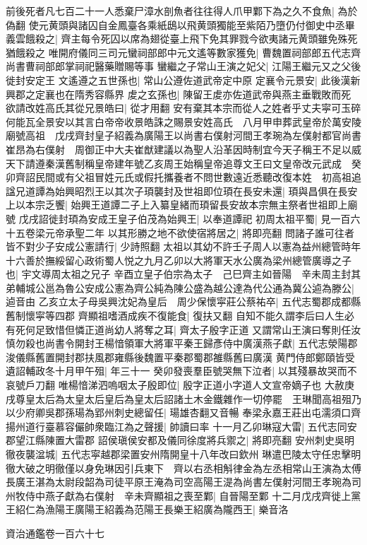 前後死者凡七百二十一人悉棄尸漳水剖魚者往往得人爪甲鄴下為之久不食魚|{
	為於偽翻}
使元黄頭與諸囚自金鳳臺各乘紙鴟以飛黄頭獨能至紫陌乃墮仍付御史中丞畢義雲餓殺之|{
	齊主每令死囚以席為翅從臺上飛下免其罪戮今欲夷諸元黄頭雖免殊死猶餓殺之}
唯開府儀同三司元蠻祠部郎中元文遙等數家獲免|{
	曹魏置祠部郎五代志齊尚書曹祠部郎掌祠祀醫藥贈賜等事}
蠻繼之子常山王演之妃父|{
	江陽王繼元又之父後徙封安定王}
文遙遵之五世孫也|{
	常山公遵佐道武帝定中原}
定襄令元景安|{
	此後漢新興郡之定襄也在隋秀容縣界}
䖍之玄孫也|{
	陳留王䖍亦佐道武帝與燕主垂戰敗而死}
欲請改姓高氏其從兄景皓曰|{
	從才用翻}
安有棄其本宗而從人之姓者乎丈夫寜可玉碎何能瓦全景安以其言白帝帝收景皓誅之賜景安姓高氏　八月甲申葬武皇帝於萬安陵廟號高祖　戊戌齊封皇子紹義為廣陽王以尚書右僕射河間王孝琬為左僕射都官尚書崔昂為右僕射　周御正中大夫崔猷建議以為聖人沿革因時制宜今天子稱王不足以威天下請遵秦漢舊制稱皇帝建年號乙亥周王始稱皇帝追尊文王曰文皇帝改元武成　癸卯齊詔民間或有父祖冒姓元氏或假托攜養者不問世數遠近悉聽改復本姓　初高祖追諡兄道譚為始興昭烈王以其次子頊襲封及世祖即位頊在長安未還|{
	頊與昌俱在長安}
上以本宗乏饗|{
	始興王道譚二子上入纂皇緒而頊留長安故本宗無主祭者世祖即上廟號}
戊戌詔徙封頊為安成王皇子伯茂為始興王|{
	以奉道譚祀}
初周太祖平蜀|{
	見一百六十五卷梁元帝承聖二年}
以其形勝之地不欲使宿將居之|{
	將即亮翻}
問諸子誰可往者皆不對少子安成公憲請行|{
	少詩照翻}
太祖以其幼不許壬子周人以憲為益州總管時年十六善於撫綏留心政術蜀人悦之九月乙卯以大將軍天水公廣為梁州總管廣導之子也|{
	宇文導周太祖之兄子}
辛酉立皇子伯宗為太子　己巳齊主如晉陽　辛未周主封其弟輔城公邕為魯公安成公憲為齊公純為陳公盛為越公達為代公通為冀公逌為滕公|{
	逌音由}
乙亥立太子母吳興沈妃為皇后　周少保懷寜莊公蔡祐卒|{
	五代志蜀郡成都縣舊制懷寜等四郡}
齊顯祖嗜酒成疾不復能食|{
	復扶又翻}
自知不能久謂李后曰人生必有死何足致惜但憐正道尚幼人將奪之耳|{
	齊太子殷字正道}
又謂常山王演曰奪則任汝慎勿殺也尚書令開封王楊愔領軍大將軍平秦王歸彥侍中廣漢燕子獻|{
	五代志滎陽郡浚儀縣舊置開封郡扶風郡雍縣後魏置平秦郡蜀郡雒縣舊曰廣漢}
黄門侍郎鄭頤皆受遺詔輔政冬十月甲午殂|{
	年三十一}
癸卯發喪羣臣號哭無下泣者|{
	以其殘暴故哭而不哀號戶刀翻}
唯楊愔涕泗嗚咽太子殷即位|{
	殷字正道小字道人文宣帝嫡子也}
大赦庚戌尊皇太后為太皇太后皇后為皇太后詔諸土木金鐵雜作一切停罷　王琳聞高祖殂乃以少府卿吳郡孫瑒為郢州刺史總留任|{
	瑒雄杏翻又音暢}
奉梁永嘉王莊出屯濡須口齊揚州道行臺慕容儼帥衆臨江為之聲援|{
	帥讀曰率}
十一月乙卯琳寇大雷|{
	五代志同安郡望江縣陳置大雷郡}
詔侯瑱侯安都及儀同徐度將兵禦之|{
	將即亮翻}
安州刺史吳明徹夜襲湓城|{
	五代志寜越郡梁置安州隋開皇十八年改曰欽州}
琳遣巴陵太守任忠擊明徹大破之明徹僅以身免琳因引兵東下　齊以右丞相斛律金為左丞相常山王演為太傅長廣王湛為太尉段韶為司徒平原王淹為司空高陽王湜為尚書左僕射河間王孝琬為司州牧侍中燕子獻為右僕射　辛未齊顯祖之喪至鄴|{
	自晉陽至鄴}
十二月戊戌齊徙上黨王紹仁為漁陽王廣陽王紹義為范陽王長樂王紹廣為隴西王|{
	樂音洛}


資治通鑑卷一百六十七
